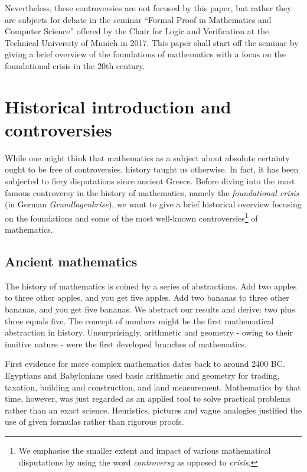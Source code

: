 \documentclass[hidelinks]{article}
\begin{document}
Nevertheless, these controversies are not focused by this paper, but rather they are subjects for debate in the seminar ``Formal Proof in Mathematics and Computer Science'' offered by the Chair for Logic and Verification at the Technical University of Munich in 2017. This paper shall start off the seminar by giving a brief overview of the foundations of mathematics with a focus on the foundational crisis in the 20th century.
\newpage

\tableofcontents 
\newpage

\section{Historical introduction and controversies}
While one might think that mathematics as a subject about absolute certainty ought to be free of controversies, history taught us otherwise. In fact, it has been subjected to fiery disputations since ancient Greece. Before diving into the most famous controversy in the history of mathematics, namely the \textit{foundational crisis} (in German \textit{Grundlagenkrise}), we want to give a brief historical overview focusing on the foundations and some of the most well-known controversies\footnote{We emphasise the smaller extent and impact of various mathematical disputations by using the word \textit{controversy} as opposed to \textit{crisis}.} of mathematics.

\subsection{Ancient mathematics}

The history of mathematics is coined by a series of abstractions.
Add two apples to three other apples, and you get five apples. Add two bananas to three other bananas, and you get five bananas. We abstract our results and derive: two plus three equals five. The concept of numbers might be the first mathematical abstraction in history. Unsurprisingly, arithmetic and geometry - owing to their inuitive nature - were the first developed branches of mathematics.

First evidence for more complex mathematics dates back to around 2400 BC\@. Egyptians and Babylonians used basic arithmetic and geometry for trading, taxation, building and construction, and land measurement. Mathematics by that time, however, was just regarded as an applied tool to solve practical problems rather than an exact science. Heuristics, pictures and vague analogies justified the use of given formulas rather than rigorous proofs.
\end{document}
